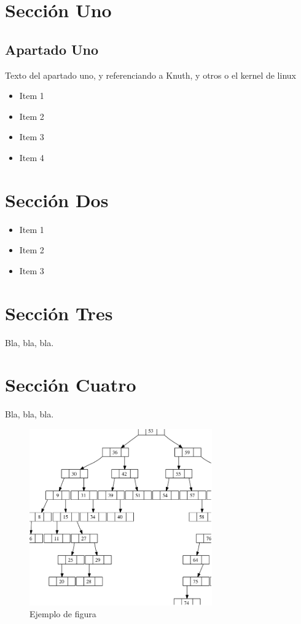 \section{Sección Uno}
\subsection{Apartado Uno}

Texto del apartado uno, y referenciando a
	Knuth\cite{knuth97,knuth:1984,texbook}, y
	otros\cite{latex:companion,latex2e,lesk:1977} o el kernel de
	linux\cite{Kernel:GitHub}

\begin{itemize}
   \item Item 1
   \item Item 2
   \item Item 3
   \item Item 4
\end{itemize}


\section{Sección Dos}


\begin{itemize}
   \item Item 1
   \item Item 2
   \item Item 3
\end{itemize}


\section{Sección Tres}


Bla, bla, bla.


\section{Sección Cuatro}


Bla, bla, bla.


\newpage

\begin{figure}[htb]
   \centering
   \includegraphics[width=0.7\textwidth]{images/figura_1}
   \caption{Ejemplo de figura}
   \label{fig:ejemplo}
\end{figure}


